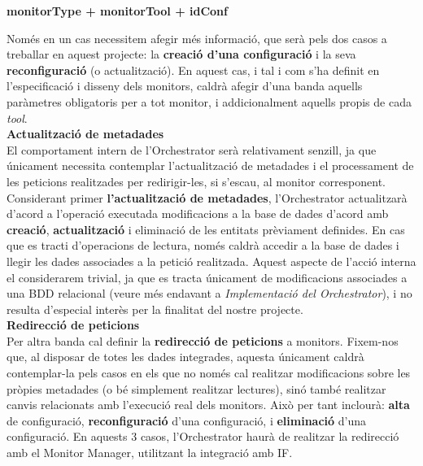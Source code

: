 \centerline{\textbf{monitorType + monitorTool + idConf}}\bigskip

Només en un cas necessitem afegir més informació, que serà pels dos casos a treballar en aquest projecte: la \textbf{creació d'una configuració} i la seva \textbf{reconfiguració} (o actualització). En aquest cas, i tal i com s'ha definit en l'especificació i disseny dels monitors, caldrà afegir d'una banda aquells paràmetres obligatoris per a tot monitor, i addicionalment aquells propis de cada \textit{tool}.\\

\noindent \textbf{\large Actualització de metadades}\\

\noindent El comportament intern de l'Orchestrator serà relativament senzill, ja que únicament necessita contemplar l'actualització de metadades i el processament de les peticions realitzades per redirigir-les, si s'escau, al monitor corresponent.\\

Considerant primer \textbf{l'actualització de metadades}, l'Orchestrator actualitzarà d'acord a l'operació executada modificacions a la base de dades d'acord amb \textbf{creació}, \textbf{actualització} i eliminació de les entitats prèviament definides. En cas que es tracti d'operacions de lectura, només caldrà accedir a la base de dades i llegir les dades associades a la petició realitzada. Aquest aspecte de l'acció interna el considerarem trivial, ja que es tracta únicament de modificacions associades a una BDD relacional (veure més endavant a \textit{Implementació del Orchestrator}), i no resulta d'especial interès per la finalitat del nostre projecte.\\

\noindent \textbf{\large Redirecció de peticions}\\

\noindent Per altra banda cal definir la \textbf{redirecció de peticions} a monitors. Fixem-nos que, al disposar de totes les dades integrades, aquesta únicament caldrà contemplar-la pels casos en els que no només cal realitzar modificacions sobre les pròpies metadades (o bé simplement realitzar lectures), sinó també realitzar canvis relacionats amb l'execució real dels monitors. Això per tant inclourà: \textbf{alta} de configuració, \textbf{reconfiguració} d'una configuració, i \textbf{eliminació} d'una configuració. En aquests 3 casos, l'Orchestrator haurà de realitzar la redirecció amb el Monitor Manager, utilitzant la integració amb IF.\\

